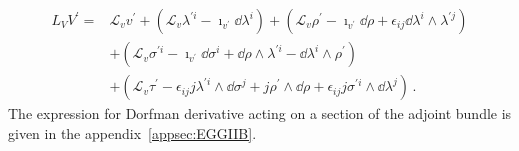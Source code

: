 \documentclass[debug]{phd}
\begin{document}
								\begin{equation}\label{eq:IIB_Dorf_vector}
									\begin{split}
										L_{V}V^{\prime} =& \mathcal{L}_{v}v^{\prime}+(\mathcal{L}_{v}\lambda^{\prime i}-\imath_{v^{\prime}}\dd\lambda^{i})+(\mathcal{L}_{v}\rho^{\prime}-\imath_{v^{\prime}}\dd\rho+\epsilon_{ij}\dd\lambda^{i}\wedge\lambda^{\prime j}) \\
 														& +(\mathcal{L}_{v}\sigma^{\prime i}-\imath_{v^{\prime}}\dd\sigma^{i}+\dd\rho\wedge\lambda^{\prime i}-\dd\lambda^{i}\wedge\rho^{\prime})\\
 														& +(\mathcal{L}_{v}\tau^{\prime}-\epsilon_{ij}j\lambda^{\prime i}\wedge\dd\sigma^{j}+j\rho^{\prime}\wedge\dd\rho+\epsilon_{ij}j\sigma^{\prime i}\wedge\dd\lambda^{j})\, .
									\end{split}
								\end{equation}
						The expression for Dorfman derivative acting on a section of the adjoint bundle is given in the appendix~\ref{appsec:EGGIIB}.
					
\end{document}
